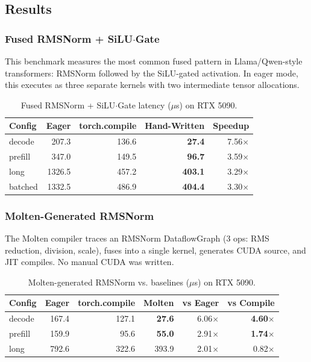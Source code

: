 \documentclass[11pt,a4paper]{article}
\begin{document}
\subsection{Results}

\subsubsection{Fused RMSNorm + SiLU$\cdot$Gate}

This benchmark measures the most common fused pattern in Llama/Qwen-style
transformers: RMSNorm followed by the SiLU-gated activation. In eager mode,
this executes as three separate kernels with two intermediate tensor allocations.

\begin{table}[h]
\centering
\caption{Fused RMSNorm + SiLU$\cdot$Gate latency ($\mu$s) on RTX 5090.}
\label{tab:fused}
\begin{tabular}{lrrrr}
\toprule
Config & Eager & torch.compile & Hand-Written & Speedup \\
\midrule
decode    & 207.3 & 136.6 & \textbf{27.4} & 7.56$\times$ \\
prefill   & 347.0 & 149.5 & \textbf{96.7} & 3.59$\times$ \\
long      & 1326.5 & 457.2 & \textbf{403.1} & 3.29$\times$ \\
batched   & 1332.5 & 486.9 & \textbf{404.4} & 3.30$\times$ \\
\bottomrule
\end{tabular}
\end{table}

\subsubsection{Molten-Generated RMSNorm}

The Molten compiler traces an RMSNorm DataflowGraph (3 ops: RMS reduction,
division, scale), fuses into a single kernel, generates CUDA source, and
JIT compiles. No manual CUDA was written.

\begin{table}[h]
\centering
\caption{Molten-generated RMSNorm vs. baselines ($\mu$s) on RTX 5090.}
\label{tab:molten}
\begin{tabular}{lrrrrr}
\toprule
Config & Eager & torch.compile & Molten & vs Eager & vs Compile \\
\midrule
decode    & 167.4 & 127.1 & \textbf{27.6} & 6.06$\times$ & \textbf{4.60$\times$} \\
prefill   & 159.9 &  95.6 & \textbf{55.0} & 2.91$\times$ & \textbf{1.74$\times$} \\
long      & 792.6 & 322.6 & 393.9 & 2.01$\times$ & 0.82$\times$ \\
\bottomrule
\end{tabular}
\end{table}
\end{document}

